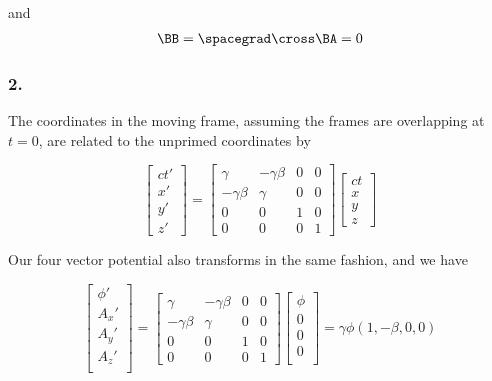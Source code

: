 and
\begin{align*}
\BB = \spacegrad \cross \BA = 0
\end{align*}

\subsubsection{2.}

The coordinates in the moving frame, assuming the frames are overlapping at $t=0$, are related to the unprimed coordinates by

\begin{equation}\label{eqn:relElectroDynProblemSet2:n}
\begin{bmatrix}
ct' \\
x' \\
y' \\
z'
\end{bmatrix}
=
\begin{bmatrix}
\gamma & -\gamma \beta & 0 & 0 \\
-\gamma \beta & \gamma & 0 & 0 \\
0 & 0 & 1 & 0 \\
0 & 0 & 0 & 1 
\end{bmatrix}
\begin{bmatrix}
ct \\
x \\
y \\
z
\end{bmatrix}
\end{equation}

Our four vector potential also transforms in the same fashion, and we have

\begin{equation}\label{eqn:relElectroDynProblemSet2:n}
\begin{bmatrix}
\phi' \\
A_x' \\
A_y' \\
A_z' \\
\end{bmatrix}
=
\begin{bmatrix}
\gamma & -\gamma \beta & 0 & 0 \\
-\gamma \beta & \gamma & 0 & 0 \\
0 & 0 & 1 & 0 \\
0 & 0 & 0 & 1 
\end{bmatrix}
\begin{bmatrix}
\phi \\
0 \\
0 \\
0 \\
\end{bmatrix}
= \gamma \phi ( 1, -\beta, 0, 0 )
\end{equation}

